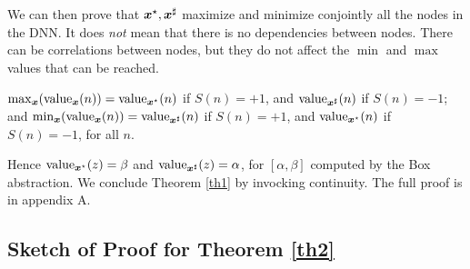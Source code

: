 We can then prove that $\boldsymbol{x}^\star,\boldsymbol{x}^\sharp$ maximize and minimize conjointly all the nodes in the DNN. It does {\em not} mean that there is no dependencies between nodes.
There can be correlations between nodes, but they do not affect the $\min$ and $\max$ values that can be reached.

\begin{proposition}
	\label{prop.sign}
	$\max_{\boldsymbol{x}} ({\textrm{value}}_{\boldsymbol{x}} (n)) = {\textrm{value}}_{\boldsymbol{x}^\star}(n)$ if $S(n)=+1$,
	and ${\textrm{value}}_{\boldsymbol{x}^\sharp}(n)$ if $S(n)=-1$; and 
	$\min_{\boldsymbol{x}} ({\textrm{value}}_{\boldsymbol{x}} (n)) = {\textrm{value}}_{\boldsymbol{x}^\sharp}(n)$ if $S(n)=+1$,
	and ${\textrm{value}}_{\boldsymbol{x}^\star}(n)$ if $S(n)=-1$, for all $n$.
\end{proposition}

Hence ${\textrm{value}}_{\boldsymbol{x}^\star}(z)=\beta$ and ${\textrm{value}}_{\boldsymbol{x}^\sharp}(z)=\alpha$,
for $[\alpha, \beta]$ computed by the Box abstraction. We conclude Theorem \ref{th1} by invocking continuity. The full proof is in appendix A.


\subsection{Sketch of Proof for Theorem \ref{th2}}
\label{sec.proofs2}


